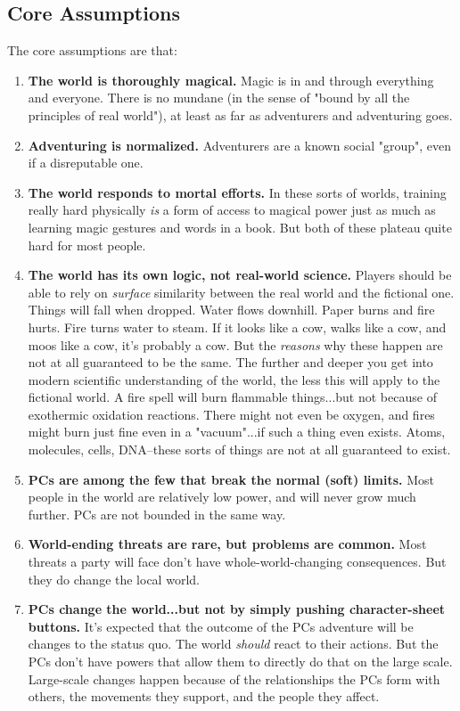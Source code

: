\subsection{Core Assumptions}
The core assumptions are that:
\begin{enumerate}
\item \textbf{The world is thoroughly magical.} Magic is in and through everything and everyone. There is no mundane (in the sense of "bound by all the principles of real world"), at least as far as adventurers and adventuring goes.
\item \textbf{Adventuring is normalized.} Adventurers are a known social "group", even if a disreputable one.
\item \textbf{The world responds to mortal efforts.} In these sorts of worlds, training really hard physically \textit{is} a form of access to magical power just as much as learning magic gestures and words in a book. But both of these plateau quite hard for most people.
\item \textbf{The world has its own logic, not real-world science.} Players should be able to rely on \textit{surface} similarity between the real world and the fictional one. Things will fall when dropped. Water flows downhill. Paper burns and fire hurts. Fire turns water to steam. If it looks like a cow, walks like a cow, and moos like a cow, it's probably a cow. But the \textit{reasons} why these happen are not at all guaranteed to be the same. The further and deeper you get into modern scientific understanding of the world, the less this will apply to the fictional world. A fire spell will burn flammable things...but not because of exothermic oxidation reactions. There might not even be oxygen, and fires might burn just fine even in a "vacuum"...if such a thing even exists. Atoms, molecules, cells, DNA--these sorts of things are not at all guaranteed to exist.
\item \textbf{PCs are among the few that break the normal (soft) limits.} Most people in the world are relatively low power, and will never grow much further. PCs are not bounded in the same way.
\item \textbf{World-ending threats are rare, but problems are common.} Most threats a party will face don't have whole-world-changing consequences. But they do change the local world.
\item \textbf{PCs change the world...but not by simply pushing character-sheet buttons.} It's expected that the outcome of the PCs adventure will be changes to the status quo. The world \textit{should} react to their actions. But the PCs don't have powers that allow them to directly do that on the large scale. Large-scale changes happen because of the relationships the PCs form with others, the movements they support, and the people they affect.

\end{enumerate}
